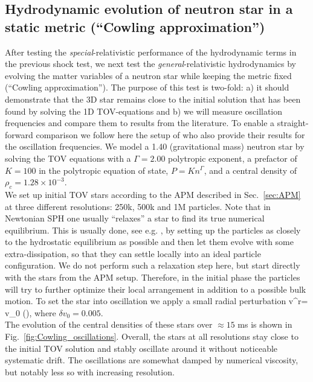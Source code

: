\documentclass[useAMS,usenatbib]{iopart}
\begin{document}
\subsection{Hydrodynamic evolution of neutron star in a static metric (``Cowling approximation'')}
\label{sec:cowling_osc}
After testing the {\em special}-relativistic performance of the hydrodynamic terms 
in the previous shock test, we next test the {\em general}-relativistic hydrodynamics 
by evolving the matter variables of a neutron star  while keeping the metric fixed (``Cowling
approximation''). The purpose of this test is two-fold: a) it should demonstrate that the 3D
star remains close to the initial solution that has been found by solving the 1D TOV-equations
and b) we will measure oscillation frequencies and compare them to results from the literature.
To enable a straight-forward  comparison we follow here the setup of \cite{font02} who also provide their 
results for the oscillation frequencies.
We model a 1.40 \Msun (gravitational mass) neutron star by solving the TOV equations 
with a $\Gamma=2.00$ polytropic exponent, a prefactor of $K= 100$ in the polytropic
equation of state, $P= K n^\Gamma$, and a central density of $\rho_c= 1.28 \times 10^{-3}$.\\
We set up initial TOV stars according to the APM described in Sec.~\ref{sec:APM} at three 
different resolutions: 250k, 500k and 1M particles. Note that in Newtonian SPH one
usually ``relaxes'' a star to find its true numerical equilibrium. This is usually done, see e.g.
\cite{rosswog99}, by setting up the particles as closely to the hydrostatic equilibrium as
possible and then let them evolve with some extra-dissipation, so that they can settle 
locally into an ideal particle configuration. We do not perform such a relaxation step here, but
start directly with the stars from the APM setup. Therefore, in the initial phase
the particles will try to further optimize their local arrangement in addition to a possible
bulk motion.  To set the star into oscillation we apply a small radial perturbation 
\be
\delta v^r=  \delta v_0  \sin\left(\right),
\label{eq:d_vr}
\ee
where $\delta v_0= 0.005$. \\
The evolution of the central densities of these stars over $\approx 15$ ms is shown in Fig.~\ref{fig:Cowling_oscillations}.
Overall, the stars at all resolutions stay close to the initial TOV solution and stably oscillate around it without noticeable
systematic drift. The oscillations are somewhat damped by numerical viscosity, but notably less so
with increasing resolution.\\
\end{document}
